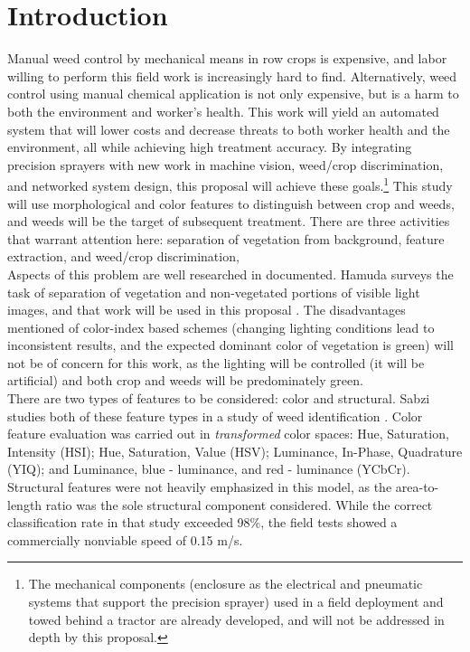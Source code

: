 \documentclass[letterpaper]{article}
\begin{document}
\section{Introduction}
Manual weed control by mechanical means in row crops is expensive, and labor willing to perform this field work is increasingly hard to find. Alternatively, weed control using manual chemical application is not only expensive, but is a harm to both the environment and worker's health. 
This work will yield an automated system that will lower costs and decrease threats to both worker health and the environment, all while achieving high treatment accuracy.  By integrating precision sprayers with new work in machine vision, weed/crop discrimination, and networked system design, this proposal will achieve these goals.\footnote{The mechanical components (enclosure as the electrical and pneumatic systems that support the precision sprayer) used in a field deployment and towed behind a tractor are already developed, and will not be addressed in depth by this proposal.}
This study will use morphological and color features to distinguish between crop and weeds, and weeds will be the target of subsequent treatment. There are three activities that warrant attention here: separation of vegetation from background, feature extraction, and weed/crop discrimination,\\
Aspects of this problem are well researched in documented. Hamuda surveys the task of separation of vegetation and non-vegetated portions of visible light images, and that work will be used in this proposal \parencite{Hamuda2016-dw}. The disadvantages mentioned of color-index based schemes (changing lighting conditions lead to inconsistent results, and the expected dominant color of vegetation is green) will not be of concern for this work, as the lighting will be controlled (it will be artificial) and both crop and weeds will be predominately green.\\
There are two types of features to be considered: color and structural. Sabzi studies both of these feature types in a study of weed identification \parencite{Sabzi2020-af}. Color feature evaluation was carried out in \textit{transformed} color spaces: Hue, Saturation, Intensity (HSI); Hue, Saturation, Value (HSV); Luminance, In-Phase, Quadrature (YIQ); and Luminance, blue - luminance, and red - luminance (YCbCr). Structural features were not heavily emphasized in this model, as the area-to-length ratio was the sole structural component considered. While the correct classification rate in that study exceeded 98\%, the field tests showed a commercially nonviable speed of 0.15 m/s. \\
\end{document}
